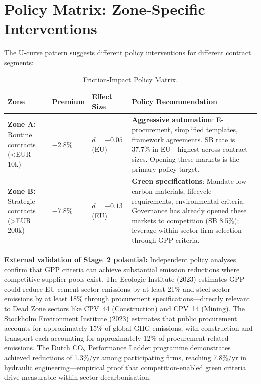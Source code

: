 \documentclass[11pt]{article}
\begin{document}
\section{Policy Matrix: Zone-Specific Interventions}

The U-curve pattern suggests different policy interventions for different contract segments:

\begin{table}[H]
\centering
\caption{Friction-Impact Policy Matrix.}
\label{tab:policymatrix}
\begin{tabular}{p{3cm}p{2cm}p{2cm}p{5cm}}
\toprule
\textbf{Zone} & \textbf{Premium} & \textbf{Effect Size} & \textbf{Policy Recommendation} \\
\midrule
\textbf{Zone A:} Routine contracts (<EUR 10k) & $-$2.8\% & $d = -0.05$ (EU) & \textbf{Aggressive automation}: E-procurement, simplified templates, framework agreements. SB rate is 37.7\% in EU---highest across contract sizes. Opening these markets is the primary policy target. \\
\midrule
\textbf{Zone B:} Strategic contracts (>EUR 200k) & $-$7.8\% & $d = -0.13$ (EU) & \textbf{Green specifications}: Mandate low-carbon materials, lifecycle requirements, environmental criteria. Governance has already opened these markets to competition (SB 8.5\%); leverage within-sector firm selection through GPP criteria. \\
\bottomrule
\end{tabular}
\end{table}

\textbf{External validation of Stage~2 potential:} Independent policy analyses confirm that GPP criteria can achieve substantial emission reductions where competitive supplier pools exist. The Ecologic Institute (2023) estimates GPP could reduce EU cement-sector emissions by at least 21\% and steel-sector emissions by at least 18\% through procurement specifications---directly relevant to Dead Zone sectors like CPV~44 (Construction) and CPV~14 (Mining). The Stockholm Environment Institute (2023) estimates that public procurement accounts for approximately 15\% of global GHG emissions, with construction and transport each accounting for approximately 12\% of procurement-related emissions. The Dutch CO$_2$ Performance Ladder programme demonstrates achieved reductions of 1.3\%/yr among participating firms, reaching 7.8\%/yr in hydraulic engineering---empirical proof that competition-enabled green criteria drive measurable within-sector decarbonisation.
\end{document}
